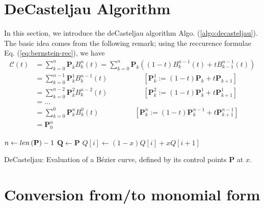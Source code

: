 \section{DeCasteljau Algorithm}
In this section, we introduce the deCasteljau algorithm Algo. (\ref{algo:decasteljau}). The basic idea comes from the following remark;
using the reccurence formulae Eq. (\ref{eq:bernstein-rec}), we have
\begin{align*}
  \mathcal{C}(t) &= \sum_{k=0}^n \mathbf{P}_k B_k^n(t) = \sum_{k=0}^n \mathbf{P}_k \left( (1-t) B_k^{n-1}(t) + t B_{k-1}^{n-1}(t) \right) \\ 
                 &= \sum_{k=0}^{n-1} \mathbf{P}_k^1  B_k^{n-1}(t) \quad\quad\quad\quad\quad [\mathbf{P}_k^{1} := (1-t)\mathbf{P}_k + t \mathbf{P}_{k+1}] \\ 
                 &= \sum_{k=0}^{n-2} \mathbf{P}_k^2  B_k^{n-2}(t) \quad\quad\quad\quad\quad [\mathbf{P}_k^{2} := (1-t)\mathbf{P}_k^1 + t \mathbf{P}_{k+1}^1] \\ 
                 &= \ldots \\
                 &= \sum_{k=0}^{0} \mathbf{P}_k^n  B_k^{0}(t) \quad\quad\quad\quad\quad [\mathbf{P}_k^{n} := (1-t)\mathbf{P}_k^{n-1} + t \mathbf{P}_{k+1}^{n-1}] \\ 
                 &= \mathbf{P}_0^n 
\end{align*}
\begin{minipage}{\textwidth}
  \begin{algorithm}[H]
  \DontPrintSemicolon
  \SetAlgoLined
  \BlankLine

  $n \gets {\sc len } \left( \mathbf{P} \right) - 1$\;
  $\mathbf{Q} \gets \mathbf{P}$\;
   {
     {
      $Q[i] \gets (1-x) Q[i] + x Q[i+1]$\;
    }
  }
  \;

  \caption{{\sc DeCasteljau}: Evaluation of a B\'ezier curve, defined by its control points $\mathbf{P}$ at $x$.}
  \label{algo:decasteljau}
  \end{algorithm} 
\end{minipage}

\section{Conversion from/to monomial form}

